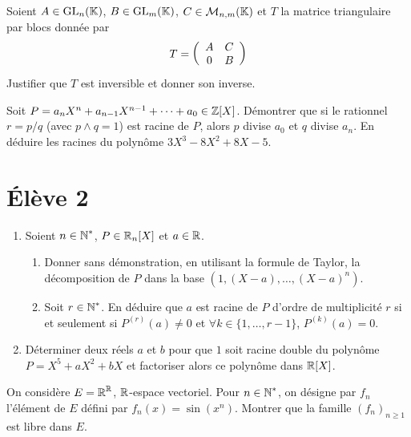 \documentclass[9pt]{scrartcl}
\begin{document}
    \begin{exo}
        Soient $A\in\operatorname{GL}_n(\operatorname{\mathbb K})$, $B\in\operatorname{GL}_m(\operatorname{\mathbb K})$, $C\in\mathcal M_{n,m}(\operatorname{\mathbb K})$ et $T$ la matrice triangulaire par blocs donnée par 
        \[
            T=\left(\begin{array}{c c} A & C\\ 0 & B \end{array}\right)
        \]
        Justifier que $T$ est inversible et donner son inverse.
    \end{exo}

    \begin{exo}
        Soit $P=a_nX^n+a_{n-1}X^{n-1}+\dots+a_0\in\operatorname{\mathbb Z}[X]$. Démontrer que si le rationnel $r=p/q$ (avec $p\wedge q=1$) est racine de $P$, alors $p$ divise $a_0$ et $q$ divise $a_n$.
        En déduire les racines du polynôme $3X^3-8X^2+8X-5$.
    \end{exo}

    \section*{Élève 2}
    \begin{ccp}
        \hfill
        \begin{enumerate}
            \item Soient $n\in\operatorname{\mathbb N}^*$, $P\in\operatorname{\mathbb R}_n[X]$ et $a\in\operatorname{\mathbb R}$.
            \begin{enumerate}
                \item Donner sans démonstration, en utilisant la formule de Taylor, la décomposition de $P$ dans la base $\left(1,(X-a),\dots,(X-a)^n\right)$.
                \item Soit $r\in\operatorname{\mathbb N}^*$. En déduire que $a$ est racine de $P$ d'ordre de multiplicité $r$ si et seulement si $P^{(r)}(a)\neq 0$ et $\forall k\in\lbrace 1,\dots,r-1\rbrace$, $P^{(k)}(a)=0$.
            \end{enumerate}
            \item Déterminer deux réels $a$ et $b$ pour que $1$ soit racine double du polynôme $P=X^5+aX^2+bX$ et factoriser alors ce polynôme dans $\operatorname{\mathbb R}[X]$.
        \end{enumerate}
    \end{ccp}

    \begin{exo}
        On considère $E=\operatorname{\mathbb R}^{\operatorname{\mathbb R}}$, $\operatorname{\mathbb R}$-espace vectoriel. 
        Pour $n\in\operatorname{\mathbb N}^*$, on désigne par $f_n$ l'élément de $E$ défini par $f_n(x)=\sin(x^n)$. 
        Montrer que la famille $(f_n)_{n\geq 1}$ est libre dans $E$.
    \end{exo}
\end{document}

